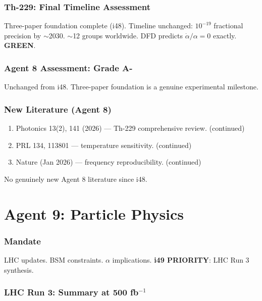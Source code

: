 \documentclass[11pt,a4paper]{article}
\newcommand{\GREEN}{\textcolor{dfdgreen}{\textbf{GREEN}}}
\begin{document}
\section{Th-229: Final Timeline Assessment}

Three-paper foundation complete (i48). Timeline unchanged: $10^{-19}$ fractional precision by $\sim$2030. $\sim$12 groups worldwide. DFD predicts $\dot{\alpha}/\alpha = 0$ exactly. \GREEN.

\section{Agent 8 Assessment: Grade A-}

Unchanged from i48. Three-paper foundation is a genuine experimental milestone.

\section{New Literature (Agent 8)}

\begin{enumerate}
\item Photonics 13(2), 141 (2026) --- Th-229 comprehensive review. (continued)
\item PRL 134, 113801 --- temperature sensitivity. (continued)
\item Nature (Jan 2026) --- frequency reproducibility. (continued)
\end{enumerate}

No genuinely new Agent 8 literature since i48.


\part{Agent 9: Particle Physics}
\label{part:agent9}

\section{Mandate}

LHC updates. BSM constraints. $\alpha$ implications. \textbf{i49 PRIORITY}: LHC Run 3 synthesis.

\section{LHC Run 3: Summary at 500 fb$^{-1}$}
\end{document}
